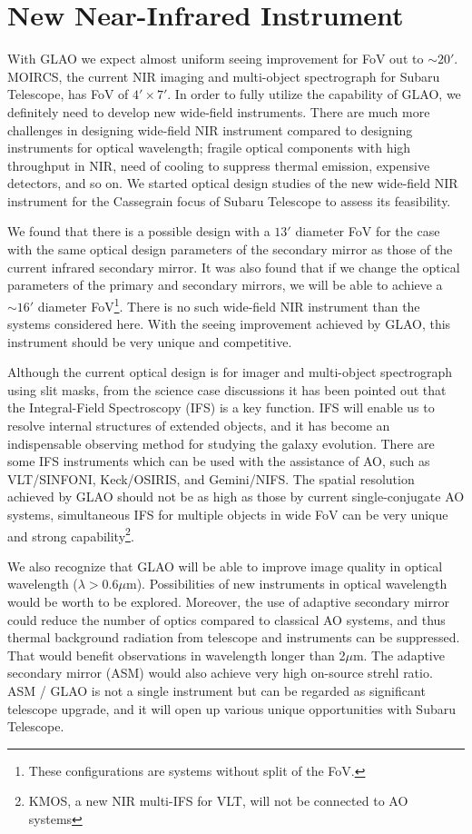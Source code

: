 \section{New Near-Infrared Instrument}

With GLAO we expect almost uniform seeing improvement for FoV out to
$\sim 20'$. MOIRCS, the current NIR imaging and multi-object
spectrograph for Subaru Telescope, has FoV of $4' \times 7'$. In order
to fully utilize the capability of GLAO, we definitely need to develop
new wide-field instruments. There are much more challenges in designing 
wide-field NIR instrument compared to designing instruments for
optical wavelength; fragile optical components with high throughput in
NIR, need of cooling to suppress thermal emission, expensive
detectors, and so on. We started optical design studies of the new
wide-field NIR instrument for the Cassegrain focus of Subaru
Telescope to assess its feasibility. %

We found that there is a possible design with a $13'$ diameter FoV for
the case with the same optical design parameters of the secondary
mirror as those of the current infrared secondary mirror. It was also 
found that if we change the optical parameters of the primary and 
secondary mirrors, we will be able to achieve a $\sim 16'$ diameter
FoV\footnote{These configurations are systems without split of the
FoV.}.
There is no such wide-field NIR instrument than the systems
considered here. With the seeing improvement achieved by GLAO, this 
instrument should be very unique and competitive.

Although the current optical design is for imager and multi-object
spectrograph using slit masks, from the science case discussions it has
been pointed out that the Integral-Field Spectroscopy (IFS) is a key
function. IFS will enable us to resolve internal structures of extended
objects, and it has become an indispensable observing method for
studying the galaxy evolution.
There are some IFS instruments which can be used with the assistance of
AO, such as VLT/SINFONI, Keck/OSIRIS, and Gemini/NIFS.
The spatial resolution achieved by GLAO should not be as high as those
by current single-conjugate AO systems, simultaneous IFS for multiple
objects in wide FoV can be very unique and strong
capability\footnote{KMOS, a new NIR multi-IFS for VLT, will not be
connected to AO systems}.

We also recognize that GLAO will be able to improve image quality in
optical wavelength ($\lambda > 0.6 \mu$m). Possibilities of new
instruments in optical wavelength would be worth to be
explored. Moreover, the use of adaptive secondary mirror could reduce
the number of optics compared to classical AO systems, and thus thermal
background radiation from telescope and instruments can be
suppressed. That would benefit observations in wavelength longer than 
2$\mu$m. The adaptive secondary mirror (ASM) would also achieve very
high on-source strehl ratio. ASM / GLAO is not a single instrument but
can be regarded as significant telescope upgrade, and it will open up
various unique opportunities with Subaru Telescope.

